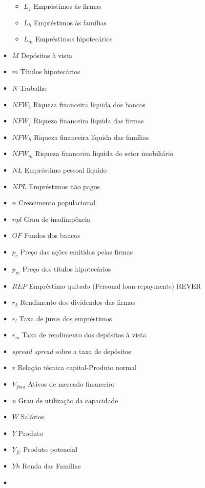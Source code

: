 \documentclass[11pt]{article}
\providecommand{\tightlist}{%
      \setlength{\itemsep}{0pt}\setlength{\parskip}{0pt}}
\begin{document}
\begin{itemize}
  \begin{itemize}
  \tightlist
  \item
    \(L_f\) Empréstimos às firmas
  \item
    \(L_h\) Empréstimos às famílias
  \item
    \(L_m\) Empréstimos hipotecários
  \end{itemize}
\item
  \(M\) Depósitos à vista
\item
  \(m\) Títulos hipotecários
\item
  \(N\) Trabalho
\item
  \(NFW_b\) Riqueza financeira líquida dos bancos
\item
  \(NFW_f\) Riqueza financeira líquida das firmas
\item
  \(NFW_h\) Riqueza financeira líquida das famílias
\item
  \(NFW_m\) Riqueza financeira líquida do setor imobiliário
\item
  \(NL\) Empréstimo pessoal líquido
\item
  \(NPL\) Empréstimos não pagos
\item
  \(n\) Crescimento populacional
\item
  \(npl\) Grau de inadimpência
\item
  \(OF\) Fundos dos bancos
\item
  \(p_e\) Preço das ações emitidas pelas firmas
\item
  \(p_m\) Preço dos títulos hipotecários
\item
  \(REP\) Empréstimo quitado (Personal loan repayments) REVER
\item
  \(r_k\) Rendimento dos dividendos das firmas
\item
  \(r_l\) Taxa de juros dos empréstimos
\item
  \(r_m\) Taxa de rendimento dos depósitos à vista
\item
  \(spread\) \emph{spread} sobre a taxa de depósitos
\item
  \(v\) Relação técnica capital-Produto normal
\item
  \(V_{fma}\) Ativos de mercado financeiro
\item
  \(u\) Grau de utilização da capacidade
\item
  \(W\) Salários
\item
  \(Y\) Produto
\item
  \(Y_{fc}\) Produto potencial
\item
  \(Yh\) Renda das Famílias
\item

\end{itemize}
\end{document}
